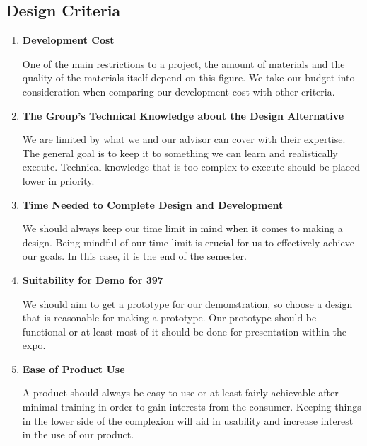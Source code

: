 \documentclass[12pt]{article}
\begin{document}
        \subsection{Design Criteria}
            \begin{enumerate}
                \item \textbf{Development Cost}
                
                One of the main restrictions to a project, the amount of materials and the quality of the materials itself depend on this figure.
                We take our budget into consideration when comparing our development cost with other criteria.

                \item \textbf{The Group's Technical Knowledge about the Design Alternative}
                
                We are limited by what we and our advisor can cover with their expertise.
                The general goal is to keep it to something we can learn and realistically execute.
                Technical knowledge that is too complex to execute should be placed lower in priority.

                \item \textbf{Time Needed to Complete Design and Development}
                
                We should always keep our time limit in mind when it comes to making a design.
                Being mindful of our time limit is crucial for us to effectively achieve our goals.
                In this case, it is the end of the semester.

                \item \textbf{Suitability for Demo for 397}
                
                We should aim to get a prototype for our demonstration, so choose a design that is reasonable for making a prototype.
                Our prototype should be functional or at least most of it should be done for presentation within the expo.

                \item \textbf{Ease of Product Use}
                
                A product should always be easy to use or at least fairly achievable after minimal training in order to gain interests from the consumer.
                Keeping things in the lower side of the complexion will aid in usability and increase interest in the use of our product.
            \end{enumerate}
        
\end{document}
